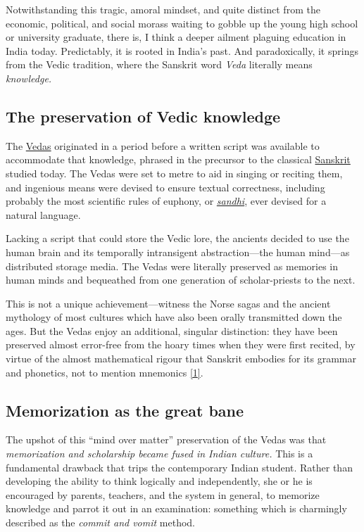 \documentclass[
  12pt,
  british,
  a4paper,
  rgb,
  dvipsnames,
  svgnames,
  hyphens]{article}
\begin{document}
Notwithstanding this tragic, amoral mindset, and quite distinct from the
economic, political, and social morass waiting to gobble up the young
high school or university graduate, there is, I think a deeper ailment
plaguing education in India today. Predictably, it is rooted in India's
past. And paradoxically, it springs from the Vedic tradition, where the
Sanskrit word \emph{Veda} literally means \emph{knowledge.}

\hypertarget{the-preservation-of-vedic-knowledge}{%
\subsection{The preservation of Vedic
knowledge}\label{the-preservation-of-vedic-knowledge}}

The \href{http://en.wikipedia.org/wiki/Vedas}{Vedas} originated in a
period before a written script was available to accommodate that
knowledge, phrased in the precursor to the classical
\href{http://en.wikipedia.org/wiki/Sanskrit}{Sanskrit} studied today.
The Vedas were set to metre to aid in singing or reciting them, and
ingenious means were devised to ensure textual correctness, including
probably the most scientific rules of euphony, or
\href{https://en.wikipedia.org/wiki/Sandhi}{\emph{sandhi}}, ever devised
for a natural language.

Lacking a script that could store the Vedic lore, the ancients decided
to use the human brain and its temporally intransigent abstraction---the
human mind---as distributed storage media. The Vedas were literally
preserved as memories in human minds and bequeathed from one generation
of scholar-priests to the next.

This is not a unique achievement---witness the Norse sagas and the
ancient mythology of most cultures which have also been orally
transmitted down the ages. But the Vedas enjoy an additional, singular
distinction: they have been preserved almost error-free from the hoary
times when they were first recited, by virtue of the almost mathematical
rigour that Sanskrit embodies for its grammar and phonetics, not to
mention mnemonics \protect\hyperlink{ref-bhatekak1993}{{[}1{]}}.

\hypertarget{memorization-as-the-great-bane}{%
\subsection{Memorization as the great
bane}\label{memorization-as-the-great-bane}}

The upshot of this ``mind over matter'' preservation of the Vedas was
that \emph{memorization and scholarship became fused in Indian culture.}
This is a fundamental drawback that trips the contemporary Indian
student. Rather than developing the ability to think logically and
independently, she or he is encouraged by parents, teachers, and the
system in general, to memorize knowledge and parrot it out in an
examination: something which is charmingly described as the \emph{commit
and vomit} method.
\end{document}
